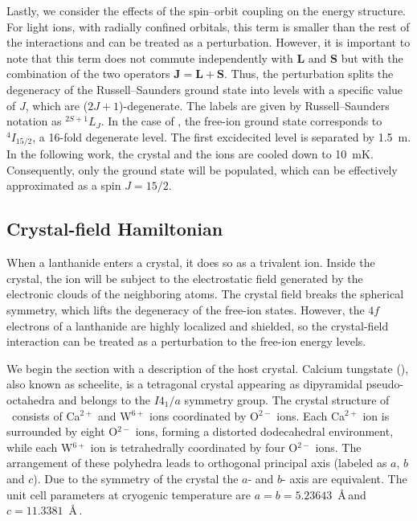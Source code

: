 Lastly, we consider the effects of the spin--orbit coupling on the energy structure. For light ions, with radially confined orbitals, this term is smaller than the rest of the interactions and can be treated as a perturbation. However, it is important to note that this term does not commute independently with $\mathbf{L}$ and $\mathbf{S}$ but with the combination of the two operators $\mathbf{J} = \mathbf{L} + \mathbf{S}$. Thus, the perturbation splits the degeneracy of the Russell--Saunders ground state into levels with a specific value of $J$, which are ($2J+1$)-degenerate. The labels are given by Russell--Saunders notation as $^{2S+1}L_J$. In the case of \Er, the free-ion ground state corresponds to $^4I_{15/2}$, a 16-fold degenerate level. The first excidecited level is separated by 1.5~\textmu m. In the following work, the \Ca crystal and the ions are cooled down to 10~mK. Consequently, only the ground state will be populated, which can be effectively approximated as a spin $J=15/2$.

\subsection{Crystal-field Hamiltonian}
When a lanthanide enters a crystal, it does so as a trivalent ion. Inside the crystal, the ion will be subject to the electrostatic field generated by the electronic clouds of the neighboring atoms. The crystal field breaks the spherical symmetry, which lifts the degeneracy of the free-ion states. However, the $4f$ electrons of a lanthanide are highly localized and shielded, so the crystal-field interaction can be treated as a perturbation to the free-ion energy levels. 

We begin the section with a description of the host crystal. Calcium tungstate (\Ca), also known as scheelite, is a tetragonal crystal appearing as dipyramidal pseudo-octahedra and belongs to the $I4_1/a$ symmetry group. The crystal structure of \Ca\ consists of Ca$^{2+}$ and W$^{6+}$ ions coordinated by O$^{2-}$ ions. Each Ca$^{2+}$ ion is surrounded by eight O$^{2-}$ ions, forming a distorted dodecahedral environment, while each W$^{6+}$ ion is tetrahedrally coordinated by four O$^{2-}$ ions. The arrangement of these polyhedra leads to orthogonal principal axis (labeled as $a$, $b$ and $c$). Due to the symmetry of the crystal the $a$- and $b$- axis are equivalent. The unit cell parameters at cryogenic temperature are $a=b=5.23643$~\AA\,and $c=11.3381$~\AA\,. 

